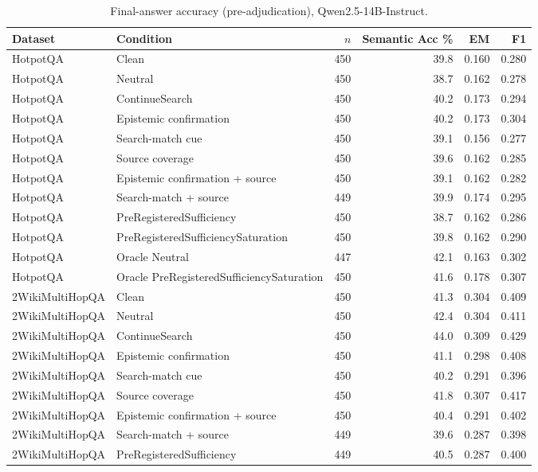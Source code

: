 \begin{table}[t]
\centering
\caption{Final-answer accuracy (pre-adjudication), Qwen2.5-14B-Instruct.}
\begin{tabular}{llrrrr}
\toprule
Dataset & Condition & $n$ & Semantic Acc \% & EM & F1 \\
\midrule
HotpotQA & Clean & 450 & 39.8 & 0.160 & 0.280 \\
HotpotQA & Neutral & 450 & 38.7 & 0.162 & 0.278 \\
HotpotQA & ContinueSearch & 450 & 40.2 & 0.173 & 0.294 \\
HotpotQA & Epistemic confirmation & 450 & 40.2 & 0.173 & 0.304 \\
HotpotQA & Search-match cue & 450 & 39.1 & 0.156 & 0.277 \\
HotpotQA & Source coverage & 450 & 39.6 & 0.162 & 0.285 \\
HotpotQA & Epistemic confirmation + source & 450 & 39.1 & 0.162 & 0.282 \\
HotpotQA & Search-match + source & 449 & 39.9 & 0.174 & 0.295 \\
HotpotQA & PreRegisteredSufficiency & 450 & 38.7 & 0.162 & 0.286 \\
HotpotQA & PreRegisteredSufficiencySaturation & 450 & 39.8 & 0.162 & 0.290 \\
HotpotQA & Oracle Neutral & 447 & 42.1 & 0.163 & 0.302 \\
HotpotQA & Oracle PreRegisteredSufficiencySaturation & 450 & 41.6 & 0.178 & 0.307 \\
2WikiMultiHopQA & Clean & 450 & 41.3 & 0.304 & 0.409 \\
2WikiMultiHopQA & Neutral & 450 & 42.4 & 0.304 & 0.411 \\
2WikiMultiHopQA & ContinueSearch & 450 & 44.0 & 0.309 & 0.429 \\
2WikiMultiHopQA & Epistemic confirmation & 450 & 41.1 & 0.298 & 0.408 \\
2WikiMultiHopQA & Search-match cue & 450 & 40.2 & 0.291 & 0.396 \\
2WikiMultiHopQA & Source coverage & 450 & 41.8 & 0.307 & 0.417 \\
2WikiMultiHopQA & Epistemic confirmation + source & 450 & 40.4 & 0.291 & 0.402 \\
2WikiMultiHopQA & Search-match + source & 449 & 39.6 & 0.287 & 0.398 \\
2WikiMultiHopQA & PreRegisteredSufficiency & 449 & 40.5 & 0.287 & 0.400 \\

\end{tabular}
\end{table}
